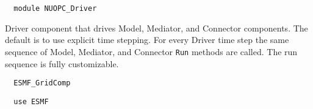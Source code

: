  
\setlength{\parskip}{0pt}
\setlength{\parindent}{0pt}
\setlength{\baselineskip}{11pt}
 
\def\bv{\begin{verbatim}}
\def\ev{\end{verbatim}}
\def\be{\begin{equation}}
\def\ee{\end{equation}}
\def\bea{\begin{eqnarray}}
\def\eea{\end{eqnarray}}
\def\bi{\begin{itemize}}
\def\ei{\end{itemize}}
\def\bn{\begin{enumerate}}
\def\en{\end{enumerate}}
\def\bd{\begin{description}}
\def\ed{\end{description}}
\def\({\left (}
\def\){\right )}
\def\[{\left [}
\def\]{\right ]}
\def\<{\left  \langle}
\def\>{\right \rangle}
\def\cI{{\cal I}}
\def\diag{\mathop{\rm diag}}
\def\tr{\mathop{\rm tr}}


\begin{verbatim}  module NUOPC_Driver
\end{verbatim}

Driver component that drives Model, Mediator, and Connector components. The default is to use explicit time stepping. For every Driver time step the same sequence of Model, Mediator, and Connector {\tt Run} methods are called. The run sequence is fully customizable.

\begin{verbatim}  ESMF_GridComp
\end{verbatim}

\begin{verbatim}  use ESMF
\end{verbatim}

